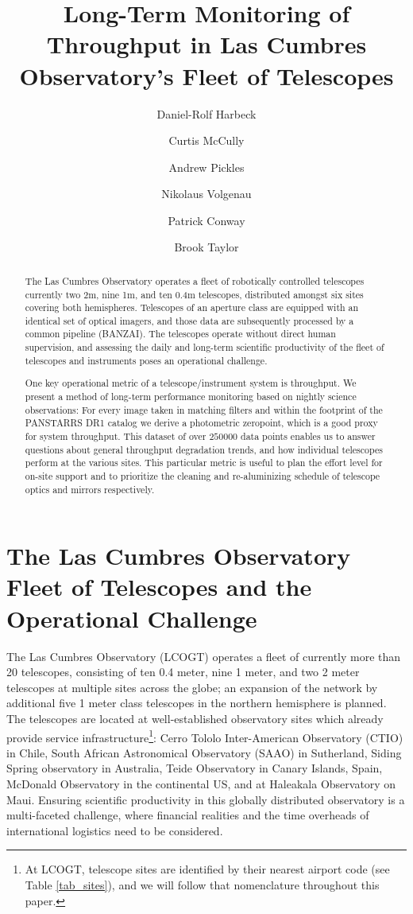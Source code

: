 \documentclass[]{spieman}
\title{Long-Term Monitoring of Throughput in Las Cumbres Observatory's Fleet of Telescopes}
\author[a]{Daniel-Rolf Harbeck}
\author[a]{Curtis McCully}
\author[a]{Andrew Pickles}
\author[a]{Nikolaus Volgenau}
\author[a]{Patrick Conway}
\author[a]{Brook Taylor}
\affil[a] {Las Cumbres Observatory, Goleta, CA (USA)}
\begin{document}
\maketitle

\begin{abstract}
The Las Cumbres Observatory operates a fleet of robotically controlled telescopes currently two 2m,
nine 1m, and ten 0.4m telescopes, distributed amongst six sites covering both hemispheres.
Telescopes of an aperture class are equipped with an identical set of optical imagers, and those
data are subsequently processed by a common pipeline (BANZAI). The telescopes operate without direct
human supervision, and assessing the daily and long-term scientific productivity of the fleet of
telescopes and instruments poses an operational challenge.

One key operational metric of a telescope/instrument system is throughput. We present a method of
long-term performance monitoring based on nightly science observations: For every image taken in
matching filters and within the footprint of the PANSTARRS DR1 catalog we derive a photometric
zeropoint, which is a good proxy for system throughput. This dataset of over $250000$ data points
enables us to answer questions about general throughput degradation trends, and how individual
telescopes perform at the various sites. This particular metric is useful to plan the effort level
for on-site support and to prioritize the cleaning and re-aluminizing schedule of telescope optics
and mirrors respectively.
\end{abstract}




\section{The Las Cumbres Observatory Fleet of Telescopes and the Operational Challenge}

The Las Cumbres Observatory (LCOGT) operates a fleet of currently more than 20 telescopes,
consisting of ten 0.4 meter, nine 1 meter, and two 2 meter telescopes at multiple sites across the
globe\cite{brown2013}; an expansion of the network by additional five 1 meter class telescopes in
the northern hemisphere is planned. The telescopes are located at well-established observatory sites
which already provide service infrastructure\footnote{At LCOGT, telescope sites are identified by
    their nearest airport code (see Table \ref{tab_sites}), and we will follow that nomenclature    
    throughout this paper.}: Cerro Tololo Inter-American Observatory (CTIO) in Chile, South 
    African
Astronomical Observatory (SAAO) in Sutherland, Siding Spring observatory in Australia, Teide
Observatory in Canary Islands, Spain, McDonald Observatory in the continental US, and at Haleakala
Observatory on
Maui. Ensuring scientific productivity in this globally distributed observatory is a multi-faceted
challenge, where financial realities and the time overheads of international logistics need to be
considered.
\end{document}
